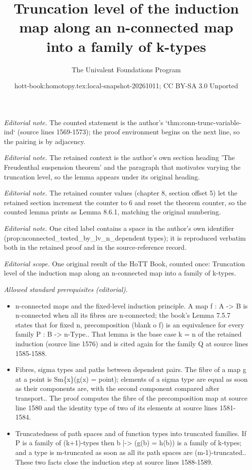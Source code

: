 \documentclass[10pt,a4paper]{article}
\title{Truncation level of the induction map along an n-connected map into a family of k-types}
\author{The Univalent Foundations Program}
\date{hott-book:homotopy.tex:local-snapshot-20261011; CC BY-SA 3.0 Unported}
\newcounter{chapter}
\theoremstyle{definition}
\theoremstyle{remark}
\numberwithin{equation}{section}
\begin{document}
\maketitle
\setcounter{chapter}{8}
\setcounter{section}{5}
\noindent\textit{Editorial note.} The counted statement is the author's `thm:conn-trunc-variable-ind` (source lines 1569-1573); the proof environment begins on the next line, so the pairing is by adjacency.\par\medskip
\noindent\textit{Editorial note.} The retained context is the author's own section heading 'The Freudenthal suspension theorem' and the paragraph that motivates varying the truncation level, so the lemma appears under its original heading.\par\medskip
\noindent\textit{Editorial note.} The retained counter values (chapter 8, section offset 5) let the retained section increment the counter to 6 and reset the theorem counter, so the counted lemma prints as Lemma 8.6.1, matching the original numbering.\par\medskip
\noindent\textit{Editorial note.} One cited label contains a space in the author's own identifier (prop:nconnected\_tested\_by\_lv\_n\_dependent types); it is reproduced verbatim both in the retained proof and in the source-reference record.\par\medskip
\noindent\textit{Editorial scope.} One original result of the HoTT Book, counted once: Truncation level of the induction map along an n-connected map into a family of k-types.\par\medskip
\noindent\textit{Allowed standard prerequisites (editorial).}\begin{itemize}
\item n-connected maps and the fixed-level induction principle. A map f : A -> B is n-connected when all its fibres are n-connected; the book's Lemma 7.5.7 states that for fixed n, precomposition (blank o f) is an equivalence for every family P : B -> n-Type.. That lemma is the base case k = n of the retained induction (source line 1576) and is cited again for the family Q at source lines 1585-1588.
\item Fibres, sigma types and paths between dependent pairs. The fibre of a map g at a point is Sm\{x\}(g(x) = point); elements of a sigma type are equal as soon as their components are, with the second component compared after transport.. The proof computes the fibre of the precomposition map at source line 1580 and the identity type of two of its elements at source lines 1581-1584.
\item Truncatedness of path spaces and of function types into truncated families. If P is a family of (k+1)-types then b |-> (g(b) = h(b)) is a family of k-types; and a type is m-truncated as soon as all its path spaces are (m-1)-truncated.. These two facts close the induction step at source lines 1588-1589.
\end{itemize}\medskip
\end{document}
